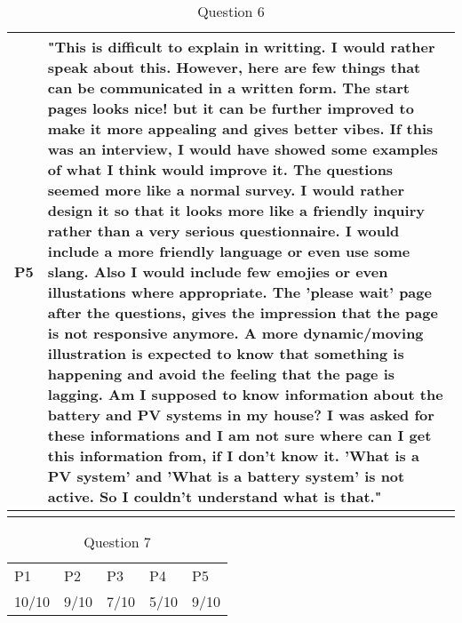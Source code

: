 \begin{center}
\begin{longtable}[h!]{ | p{} | p{} | }
    \hline
    P5 & "This is difficult to explain in writting. I would rather speak about this. However, here are few things that can be communicated in a written form. 
    The start pages looks nice! but it can be further improved to make it more appealing and gives better vibes. If this was an interview, I would have showed some examples of what I think would improve it. 
    The questions seemed more like a normal survey. I would rather design it so that it looks more like a friendly inquiry rather than a very serious questionnaire. I would include a more friendly language or even use some slang. Also I would  include few emojies or even illustations where appropriate.
    The 'please wait' page after the questions, gives the impression that the page is not responsive anymore. A more dynamic/moving illustration is expected to know that something is happening and avoid the feeling that the page is lagging. 
    Am I supposed to know information about the battery and PV systems in my house? I was asked for these informations and I am not sure where can I get this information from, if I don't know it. 
    'What is a PV system' and 'What is a battery system' is not active. So I couldn't understand what is that." \\
    \hline
  \caption[]{Question 6}
  \label{tab:question_6}
  \end{longtable}
\end{center}

\begin{center}
  \begin{table}[h!]
  \scriptsize
  \begin{tabular}{ | p{} | p{} | p{} | p{} | p{} | }
    \hline  
    \rowcolor{lightgray} \multicolumn{5}{|c|}{Q7. Were the recommendations easy to understand?} \\
    \hline
    P1 & P2 & P3 & P4 & P5 \\
    \hline
    10/10 & 9/10 & 7/10 & 5/10 & 9/10 \\
    \hline
  \end{tabular}
  \caption[]{Question 7}
  \label{tab:question_7}
  \end{table}
\end{center}

